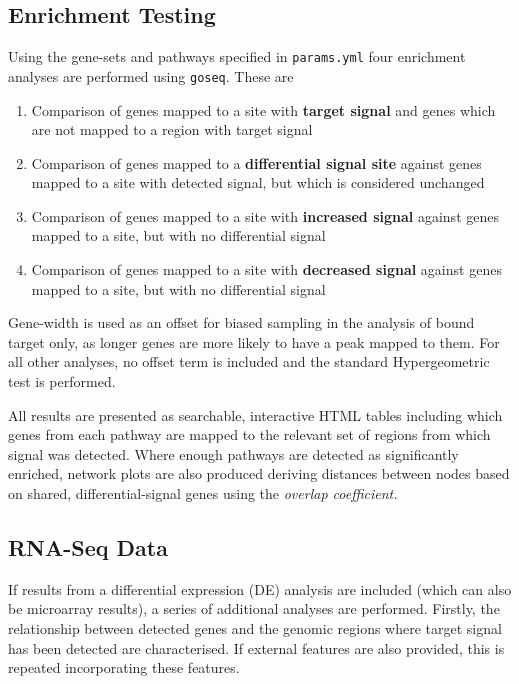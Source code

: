 \documentclass[
]{book}
\providecommand{\tightlist}{%
  \setlength{\itemsep}{0pt}\setlength{\parskip}{0pt}}
\begin{document}
\hypertarget{enrichment-testing}{%
\subsection*{Enrichment Testing}\label{enrichment-testing}}

Using the gene-sets and pathways specified in \texttt{params.yml} four enrichment analyses are performed using \texttt{goseq}\citep{goseq}.
These are

\begin{enumerate}
\def\labelenumi{\arabic{enumi}.}
\tightlist
\item
  Comparison of genes mapped to a site with \textbf{target signal} and genes which are not mapped to a region with target signal
\item
  Comparison of genes mapped to a \textbf{differential signal site} against genes mapped to a site with detected signal, but which is considered unchanged
\item
  Comparison of genes mapped to a site with \textbf{increased signal} against genes mapped to a site, but with no differential signal
\item
  Comparison of genes mapped to a site with \textbf{decreased signal} against genes mapped to a site, but with no differential signal
\end{enumerate}

Gene-width is used as an offset for biased sampling in the analysis of bound target only, as longer genes are more likely to have a peak mapped to them.
For all other analyses, no offset term is included and the standard Hypergeometric test is performed.

All results are presented as searchable, interactive HTML tables including which genes from each pathway are mapped to the relevant set of regions from which signal was detected.
Where enough pathways are detected as significantly enriched, network plots are also produced deriving distances between nodes based on shared, differential-signal genes using the \emph{overlap coefficient.}

\hypertarget{rna-seq-data}{%
\subsection*{RNA-Seq Data}\label{rna-seq-data}}

If results from a differential expression (DE) analysis are included (which can also be microarray results), a series of additional analyses are performed.
Firstly, the relationship between detected genes and the genomic regions where target signal has been detected are characterised.
If external features are also provided, this is repeated incorporating these features.
\end{document}
